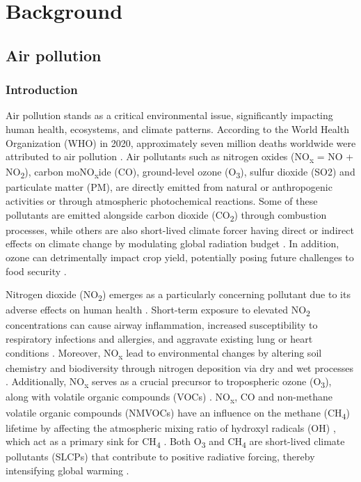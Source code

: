 \chapter{Background} \label{chap2}
\renewcommand{\headrulewidth}{0pt}
\lhead[\thepage]{\leftmark}
\rhead[\leftmark]{\thepage}
\cfoot[]{}

\section{Air pollution}
\subsection{Introduction}

Air pollution stands as a critical environmental issue, significantly impacting human health, ecosystems, and climate patterns. According to the World Health Organization (WHO) in 2020, approximately seven million deaths worldwide were attributed to air pollution \citep{who2020world}. Air pollutants such as nitrogen oxides (NO\textsubscript{x} = NO + NO\textsubscript{2}), carbon moNO\textsubscript{x}ide (CO), ground-level ozone (O\textsubscript{3}), sulfur dioxide (SO2) and particulate matter (PM), are directly emitted from natural or anthropogenic activities or through atmospheric photochemical reactions. Some of these pollutants are emitted alongside carbon dioxide (CO\textsubscript{2}) through combustion processes, while others are also short-lived climate forcer having direct or indirect effects on climate change by modulating global radiation budget \citep{RN3}. In addition, ozone can detrimentally impact crop yield, potentially posing future challenges to food security \citep{avnery2011global, avnery2011global2, chuwah2015global, tai2017impacts}.\par
Nitrogen dioxide (NO\textsubscript{2}) emerges as a particularly concerning pollutant due to its adverse effects on human health \citep{hamra2015lung}. Short-term exposure to elevated NO\textsubscript{2} concentrations can cause airway inflammation, increased susceptibility to respiratory infections and allergies, and aggravate existing lung or heart conditions \citep{bono2016air, kelly2011air}. Moreover, NO\textsubscript{x} lead to environmental changes by altering soil chemistry and biodiversity through nitrogen deposition via dry and wet processes \citep{bobbink2010global}. Additionally, NO\textsubscript{x} serves as a crucial precursor to tropospheric ozone (O\textsubscript{3}), along with volatile organic compounds (VOCs) \citep{akimoto2022rethinking}. NO\textsubscript{x}, CO and non-methane volatile organic compounds (NMVOCs) have an influence on the methane (CH\textsubscript{4}) lifetime by affecting the atmospheric mixing ratio of hydroxyl radicals (OH) \citep{akimoto2022rethinking}, which act as a primary sink for CH\textsubscript{4} \citep{turner2019interpreting}. Both O\textsubscript{3} and CH\textsubscript{4} are short-lived climate pollutants (SLCPs) that contribute to positive radiative forcing, thereby intensifying global warming \citep{akimoto2022rethinking}. 
